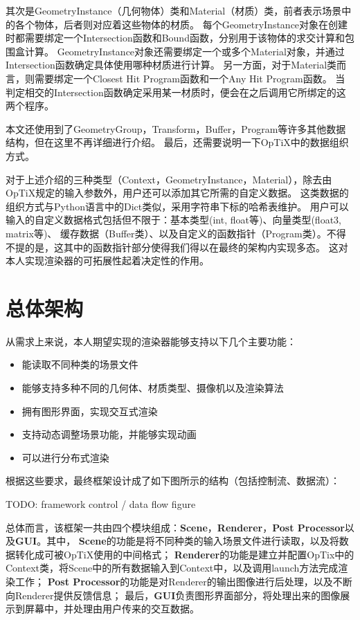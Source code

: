 其次是GeometryInstance（几何物体）类和Material（材质）类，前者表示场景中的各个物体，后者则对应着这些物体的材质。
每个GeometryInstance对象在创建时都需要绑定一个Intersection函数和Bound函数，分别用于该物体的求交计算和包围盒计算。
GeometryInstance对象还需要绑定一个或多个Material对象，并通过Intersection函数确定具体使用哪种材质进行计算。
另一方面，对于Material类而言，则需要绑定一个Closest Hit Program函数和一个Any Hit Program函数。
当判定相交的Intersection函数确定采用某一材质时，便会在之后调用它所绑定的这两个程序。

本文还使用到了GeometryGroup，Transform，Buffer，Program等许多其他数据结构，但在这里不再详细进行介绍。
最后，还需要说明一下OpTiX中的数据组织方式。

对于上述介绍的三种类型（Context，GeometryInstance，Material），除去由OpTiX规定的输入参数外，用户还可以添加其它所需的自定义数据。
这类数据的组织方式与Python语言中的Dict类似，采用字符串下标的哈希表维护。
用户可以输入的自定义数据格式包括但不限于：基本类型(int, float等)、向量类型(float3, matrix等)、
缓存数据（Buffer类）、以及自定义的函数指针（Program类）。不得不提的是，这其中的函数指针部分使得我们得以在最终的架构内实现多态。
这对本人实现渲染器的可拓展性起着决定性的作用。

\section{总体架构}
 
从需求上来说，本人期望实现的渲染器能够支持以下几个主要功能：

\begin{itemize}
    \item{能读取不同种类的场景文件}
    \item{能够支持多种不同的几何体、材质类型、摄像机以及渲染算法}
    \item{拥有图形界面，实现交互式渲染}
    \item{支持动态调整场景功能，并能够实现动画}
    \item{可以进行分布式渲染}
\end{itemize}

根据这些要求，最终框架设计成了如下图所示的结构（包括控制流、数据流）：

TODO: framework control / data flow figure

总体而言，该框架一共由四个模块组成：\textbf{Scene}，\textbf{Renderer}，\textbf{Post Processor}以及\textbf{GUI}。其中，
\textbf{Scene}的功能是将不同种类的输入场景文件进行读取，以及将数据转化成可被OpTiX使用的中间格式；
\textbf{Renderer}的功能是建立并配置OpTix中的Context类，将Scene中的所有数据输入到Context中，以及调用launch方法完成渲染工作；
\textbf{Post Processor}的功能是对Renderer的输出图像进行后处理，以及不断向Renderer提供反馈信息；
最后，\textbf{GUI}负责图形界面部分，将处理出来的图像展示到屏幕中，并处理由用户传来的交互数据。

